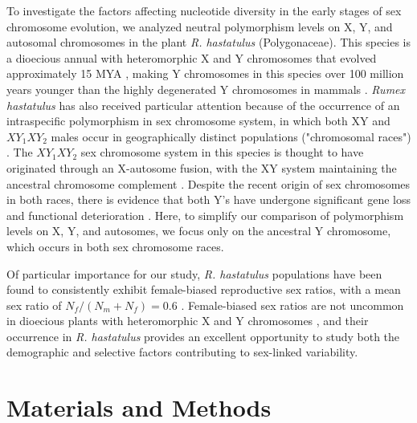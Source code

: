 \documentclass[9pt,twocolumn,twoside]{gsajnl}
\begin{document}
To investigate the factors affecting nucleotide diversity in the early stages of sex chromosome evolution, we analyzed neutral polymorphism levels on X, Y, and autosomal chromosomes in the plant \textit{R. hastatulus }(Polygonaceae). This species is a dioecious annual with heteromorphic X and Y chromosomes that evolved approximately 15 MYA \citep{quesada2011,grabowska2015,navajas2005}, making Y chromosomes in this species over 100 million years younger than the highly degenerated Y chromosomes in mammals \citep{lahn1999,ross2005dna}. \textit{Rumex hastatulus} has also received particular attention because of the occurrence of an intraspecific polymorphism in sex chromosome system, in which both XY and $XY_{1}XY_{2}$ males occur in geographically distinct populations ("chromosomal races") \citep{smith1963mechanism}. The $XY_{1}XY_{2}$ sex chromosome system in this species is thought to have originated through an X-autosome fusion, with the XY system maintaining the ancestral chromosome complement \citep{smith1964evolving}. Despite the recent origin of sex chromosomes in both races, there is evidence that both Y's have undergone significant gene loss and functional deterioration \citep{hough2014}. Here, to simplify our comparison of polymorphism levels on X, Y, and autosomes, we focus only on the ancestral Y chromosome, which occurs in both sex chromosome races.

Of particular importance for our study, \textit{R. hastatulus} populations have been found to consistently exhibit female-biased reproductive sex ratios, with a mean sex ratio of $N_{f}/(N_{m}+N_{f})=0.6$ \citep{pickup2013influence}. Female-biased sex ratios are not uncommon in dioecious plants with heteromorphic X and Y chromosomes \citep{field2013comparative,hough2013evolutionarily}, and their occurrence in \textit{R. hastatulus} provides an excellent opportunity to study both the demographic and selective factors contributing to sex-linked variability.

\section*{Materials and Methods}
\end{document}
